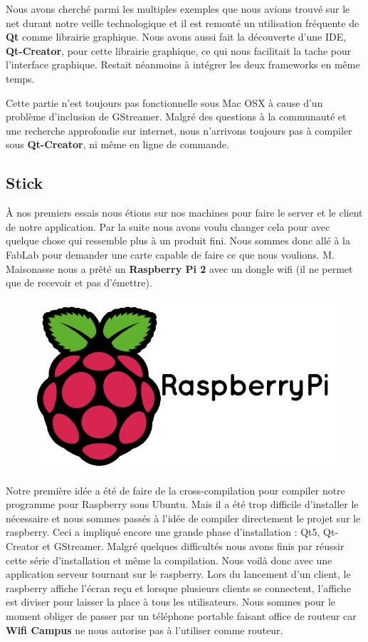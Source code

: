 \documentclass[a4paper, 11pt]{article}
\begin{document}
Nous avons cherché parmi les multiples exemples que nous avions trouvé sur le net durant notre veille technologique et il est remonté un utilisation fréquente de \textbf{Qt} comme librairie graphique. Nous avons aussi fait la découverte d'une IDE, \textbf{Qt-Creator}, pour cette librairie graphique, ce qui nous facilitait la tache pour l'interface graphique. Restait néanmoins à intégrer les deux frameworks en même temps.

Cette partie n'est toujours pas fonctionnelle sous Mac OSX à cause d'un problème d'inclusion de GStreamer. Malgré des questions à la communauté et une recherche approfondie sur internet, nous n'arrivons toujours pas à compiler sous \textbf{Qt-Creator}, ni même en ligne de commande.

\subsection{Stick}

À nos premiers essais nous étions sur nos machines pour faire le server et le client de notre application. Par la suite nous avons voulu changer cela pour avec quelque chose qui ressemble plus à un produit fini. Nous sommes donc allé à la FabLab pour demander une carte capable de faire ce que nous voulions. M. Maisonasse nous a prêté un \textbf{Raspberry Pi 2} avec un dongle wifi (il ne permet que de recevoir et pas d'émettre).

\begin{figure}[!h]
	\centering
	\includegraphics[width=1\textwidth]{raspberry_pi_logo.png}
\end{figure}

Notre première idée a été de faire de la cross-compilation pour compiler notre programme pour Raspberry sous Ubuntu. Mais il a été trop difficile d'installer le nécessaire et nous sommes passés à l'idée de compiler directement le projet sur le raspberry. Ceci a impliqué encore une grande phase d'installation : Qt5, Qt-Creator et GStreamer. Malgré quelques difficultés nous avons finis par réussir cette série d'installation et même la compilation. Nous voilà donc avec une application serveur tournant sur le raspberry. Lors du lancement d'un client, le raspberry affiche l'écran reçu et lorsque plusieurs clients se connectent, l'affiche est diviser pour laisser la place à tous les utilisateurs. Nous sommes pour le moment obliger de passer par un téléphone portable faisant office de routeur car \textbf{Wifi Campus} ne nous autorise pas à l'utiliser comme routeur.
\end{document}
